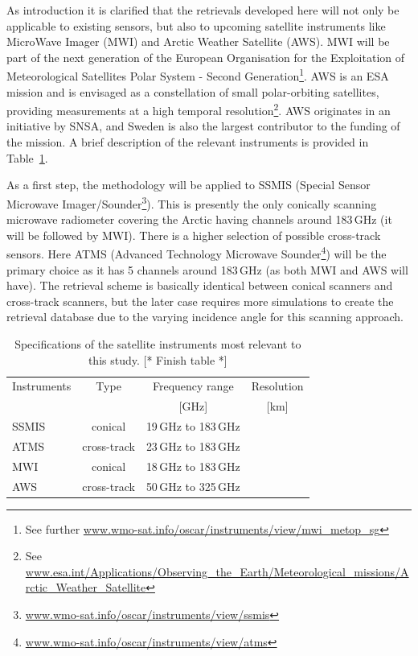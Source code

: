 \documentclass[12pt,oneside,a4paper]{article}
\newcommand\intodo[1]{{\color{red} [* #1 *]}}
\begin{document}
As introduction it is clarified that the retrievals developed here will not
only be applicable to existing sensors, but also to upcoming satellite
instruments like MicroWave Imager (MWI) and Arctic Weather Satellite (AWS). MWI
will be part of the next generation of the European Organisation for the
Exploitation of Meteorological Satellites Polar System - Second
Generation\footnote{See further
  \url{www.wmo-sat.info/oscar/instruments/view/mwi_metop_sg}}. AWS is an ESA
mission and is envisaged as a constellation of small polar-orbiting satellites,
providing measurements at a high temporal resolution\footnote{See
  \url{www.esa.int/Applications/Observing_the_Earth/Meteorological_missions/Arctic_Weather_Satellite}}.
AWS originates in an initiative by SNSA, and Sweden is also the largest
contributor to the funding of the mission. A brief description of the relevant
instruments is provided in Table~\ref{tab:specifications_instruments}.

As a first step, the methodology will be applied to SSMIS (Special Sensor
Microwave Imager/Sounder\footnote{\url{www.wmo-sat.info/oscar/instruments/view/ssmis}}). This is presently the only conically scanning
microwave radiometer covering the Arctic having channels around 183\,GHz (it
will be followed by MWI). There is a higher selection of possible cross-track
sensors. Here ATMS (Advanced Technology Microwave Sounder\footnote{\url{www.wmo-sat.info/oscar/instruments/view/atms}}) will be the primary
choice as it has 5 channels around 183\,GHz (as both MWI and AWS will have).
The retrieval scheme is basically identical between conical scanners and
cross-track scanners, but the later case requires more simulations to create
the retrieval database due to the varying incidence angle for this scanning approach. 

\begin{table}[t]
	\centering
	\caption{Specifications of the satellite instruments most relevant to this
      study.\intodo{Finish table}}
	\label{tab:specifications_instruments}	
	\begin{tabular}{lccc}

		Instruments &Type& Frequency range 	& Resolution  \\
					&     & 	[GHz]				& [km]			\\
		\hline			
		SSMIS		&conical	&19\,GHz to 183\,GHz& \\
		ATMS        &cross-track&23\,GHz to 183\,GHz &\\
		\hline
		MWI         &conical     &18\,GHz to 183\,GHz&\\
		AWS         &cross-track &50\,GHz to 325\,GHz&\\ 
		
		\hline			

	\end{tabular}
\end{table}
\end{document}

